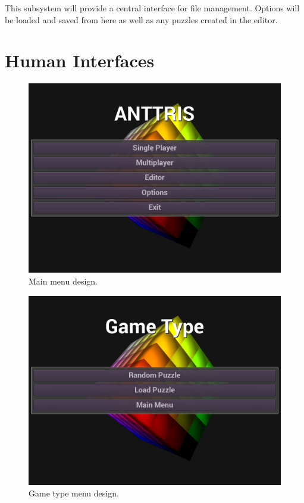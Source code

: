 \documentclass[12pt]{article}
\begin{document}
This subsystem will provide a central interface for file management. Options will be loaded and saved from here as well as any puzzles created in the editor.
\section{Human Interfaces} %
    \begin{figure}[H]
        \centering
        \includegraphics[width=4.5in]{Anttris_MainMenu.png}
        \caption{Main menu design.}
    \end{figure}
    \begin{figure}[H]
        \centering
        \includegraphics[width=4.5in]{Anttris_GTMenu.png}
        \caption{Game type menu design.}
    \end{figure}
\end{document}
